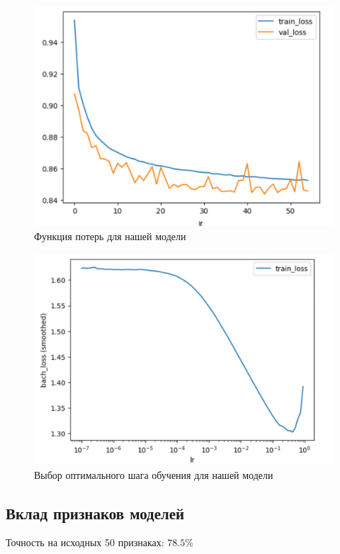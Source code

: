 \documentclass[a4paper,14pt,oneside,openany]{memoir}
\begin{document}
\begin{figure}[H]
	\includegraphics[width=\textwidth]{../figures/our_losses_30_epoch.png}
	\caption{Функция потерь для нашей модели}
\end{figure}

\begin{figure}[H]
	\includegraphics[width=\textwidth]{../figures/our_losses_30_epoch_lr.png}
	\caption{Выбор оптимального шага обучения для нашей модели}
\end{figure}

\subsection{Вклад признаков моделей}

Точность на исходных 50 признаках: $78.5\%$
\end{document}
